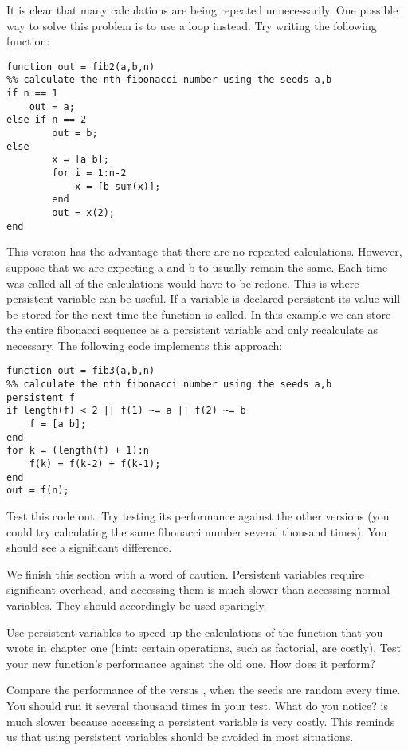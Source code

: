 It is clear that many calculations are being repeated unnecessarily. One possible way to solve this problem is to use a  loop instead. Try writing the following function:

\begin{lstlisting}[style=matlab]
function out = fib2(a,b,n)
%% calculate the nth fibonacci number using the seeds a,b
if n == 1
	out = a;
else if n == 2
        out = b;
else
        x = [a b];
        for i = 1:n-2
            x = [b sum(x)];
        end
        out = x(2);
end
\end{lstlisting}

This version has the advantage that there are no repeated calculations. However, suppose that we are expecting a and b to usually remain the same. Each time  was called all of the calculations would have to be redone. This is where persistent variable can be useful. If a variable is declared persistent its value will be stored for the next time the function is called. In this example we can store the entire fibonacci sequence as a persistent variable and only recalculate as necessary. The following code implements this approach:

\begin{lstlisting}[style=matlab]
function out = fib3(a,b,n)
%% calculate the nth fibonacci number using the seeds a,b
persistent f
if length(f) < 2 || f(1) ~= a || f(2) ~= b
    f = [a b];
end
for k = (length(f) + 1):n
    f(k) = f(k-2) + f(k-1);
end
out = f(n);
\end{lstlisting}

Test this code out. Try testing its performance against the other versions (you could try calculating the same fibonacci number several thousand times). You should see a significant difference.

We finish this section with a word of caution. Persistent variables require significant overhead, and accessing them is much slower than accessing normal variables. They should accordingly be used sparingly.

\begin{problem}
Use persistent variables to speed up the calculations of the  function that you wrote in chapter one (hint: certain operations, such as factorial, are costly). Test your new function's performance against the old one. How does it perform?
\end{problem}

\begin{problem}
Compare the performance of the  versus , when the seeds are random every time. You should run it several thousand times in your test. What do you notice?  is much slower because accessing a persistent variable is very costly. This reminds us that using persistent variables should be avoided in most situations.
\end{problem}
